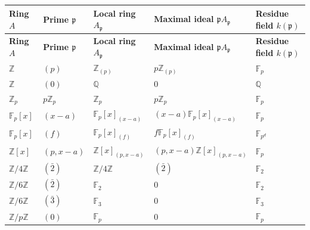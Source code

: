 \documentclass[12pt,a4paper]{article}
\theoremstyle{notespace}
\newcommand{\mf}{\mathfrak}
\theoremstyle{definition}
\begin{document}
\begin{center}
	\renewcommand{\arraystretch}{1.35}
	\begin{longtable}{>{\raggedright\arraybackslash}p{}
			>{\raggedright\arraybackslash}p{}
			>{\raggedright\arraybackslash}p{}
			>{\raggedright\arraybackslash}p{}
			>{\raggedright\arraybackslash}p{}}
		\toprule
		\textbf{Ring \(A\)} & \textbf{Prime \(\mf p\)} & \textbf{Local ring \(A_{\mf p}\)} & \textbf{Maximal ideal \(\mf p A_{\mf p}\)} & \textbf{Residue field \(k(\mf p)\)} \\
		\midrule
		\endfirsthead
		
		\toprule
		\textbf{Ring \(A\)} & \textbf{Prime \(\mf p\)} & \textbf{Local ring \(A_{\mf p}\)} & \textbf{Maximal ideal \(\mf p A_{\mf p}\)} & \textbf{Residue field \(k(\mf p)\)} \\
		\midrule
		\endhead
		
		\bottomrule
		\endfoot
		
		\(\mathbb Z\) & \((p)\) & \(\mathbb Z_{(p)}\) & \(p\mathbb Z_{(p)}\) & \(\mathbb F_p\) \\
		
		\(\mathbb Z\) & \((0)\) & \(\mathbb Q\) & \(0\) & \(\mathbb Q\) \\
		
		\(\mathbb Z_p\) & \(p\mathbb Z_p\) & \(\mathbb Z_p\) & \(p\mathbb Z_p\) & \(\mathbb F_p\) \\
		
		\(\mathbb F_p[x]\) & \((x-a)\) & \(\mathbb F_p[x]_{(x-a)}\) & \((x-a)\mathbb F_p[x]_{(x-a)}\) & \(\mathbb F_p\) \\
		
		\(\mathbb F_p[x]\) & \((f)\) & \(\mathbb F_p[x]_{(f)}\) & \(f\mathbb F_p[x]_{(f)}\) & \(\mathbb F_{p^d}\) \\
		
		\(\mathbb Z[x]\) & \((p,x-a)\) & \(\mathbb Z[x]_{(p,x-a)}\) & \((p,x-a)\mathbb Z[x]_{(p,x-a)}\) & \(\mathbb F_p\) \\
		
		\(\mathbb Z/4\mathbb Z\) & \((\bar 2)\) & \(\mathbb Z/4\mathbb Z\) & \((\bar 2)\) & \(\mathbb F_2\) \\
		
		\(\mathbb Z/6\mathbb Z\) & \((\bar 2)\) & \(\mathbb F_2\) & \(0\) & \(\mathbb F_2\) \\
		
		\(\mathbb Z/6\mathbb Z\) & \((\bar 3)\) & \(\mathbb F_3\) & \(0\) & \(\mathbb F_3\) \\
		
		\(\mathbb Z/p\mathbb Z\) & \((0)\) & \(\mathbb F_p\) & \(0\) & \(\mathbb F_p\) \\
	\end{longtable}
\end{center}
\end{document}
